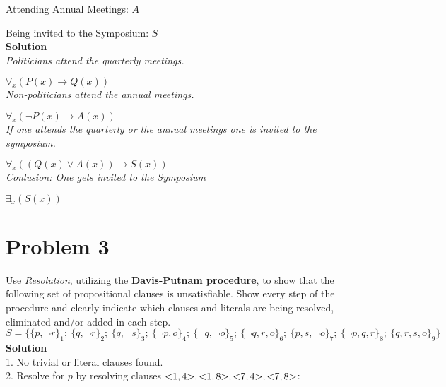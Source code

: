 \documentclass{article}
\newcommand{\solution}{\textbf{\large Solution}}
\begin{document}
Attending Annual Meetings: $A$

Being invited to the Symposium: $S$\\

\solution\\

\emph{Politicians attend the quarterly meetings.}

$\forall_{x}(P(x) \rightarrow Q(x))$\\


\emph{Non-politicians attend the annual meetings.}

$\forall_{x}(\neg{P(x)} \rightarrow A(x))$\\


\emph{If one attends the quarterly or the annual meetings one is invited to the symposium.}

$\forall_{x}((Q(x) \vee A(x)) \rightarrow S(x))$\\

\emph{Conlusion: One gets invited to the Symposium}

$\exists_{x}(S(x))$\\
\pagebreak

\section*{Problem 3}
Use \emph{Resolution}, utilizing the \textbf{Davis-Putnam procedure}, to show that the following set of propositional clauses is unsatisfiable. Show every step of the procedure and clearly indicate which clauses and literals are being resolved, eliminated and/or added in each step.\\

\noindent
\small{
    $S = \{\{p, \neg{r}\}_{1};\ \{q, \neg{r}\}_{2};\ \{q, \neg{s}\}_{3};\ \{\neg{p},     o\}_{4};\ \{\neg{q}, \neg{o}\}_{5};\ \{\neg{q}, r, o\}_{6};\ \{p, s, \neg{o    }\}_{7};\ \{\neg{p}, q, r\}_{8};\ \{q, r, s, o\}_{9}\}$
}\\

\noindent
\solution\\


1. No trivial or literal clauses found.\\

2. Resolve for $p$ by resolving clauses $\text{\textless}1, 4\text{\textgreater}, \text{\textless}1, 8\text{\textgreater}, \text{\textless}7, 4\text{\textgreater}, \text{\textless}7, 8\text{\textgreater}$:
\end{document}
